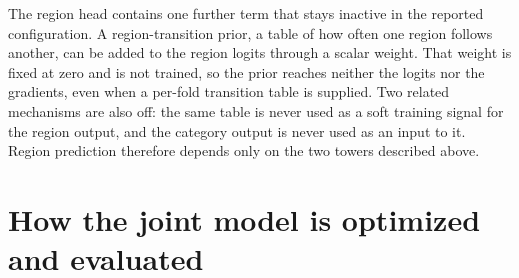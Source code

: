 The region head contains one further term that stays inactive in the reported
configuration. A region-transition prior, a table of how often one region follows
another, can be added to the region logits through a scalar weight. That weight is
fixed at zero and is not trained, so the prior reaches neither the logits nor the
gradients, even when a per-fold transition table is supplied. Two related mechanisms
are also off: the same table is never used as a soft training signal for the region
output, and the category output is never used as an input to it. Region prediction
therefore depends only on the two towers described above.

\section{How the joint model is optimized and evaluated}
\label{sec:apx-joint-training}

